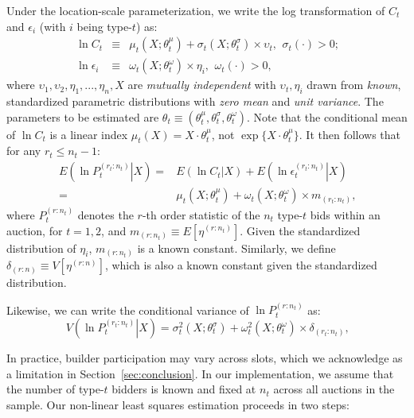 \documentclass[12pt,reqno]{amsart}
\begin{document}
Under the location-scale parameterization, we write the log transformation of $C_{t}$ and $\epsilon _{i}$ (with $i$
being type-$t$) as:%
\begin{eqnarray*}
\ln C_{t} &\equiv &\mu _{t}(X;\theta _{t}^{\mu })+\sigma _{t}(X;\theta
_{t}^{\sigma })\times \upsilon _{t}\text{, }\ \sigma _{t}(\cdot )>0\text{;} \\
\ln \epsilon _{i} &\equiv &\omega _{t}(X;\theta _{t}^{\omega })\times \eta _{i}%
\text{, }\ \omega _{t}(\cdot )>0\text{,}
\end{eqnarray*}%
where $\upsilon _{1},\upsilon _{2},\eta _{1},...,\eta _{n},X$ are \textit{%
mutually independent} with $\upsilon _{t},\eta _{i}$ drawn from \textit{known},
standardized parametric distributions with \textit{zero mean} and \textit{%
unit variance}. 
The parameters to be estimated are $\theta_t \equiv (\theta_t^\mu,\theta_t^\sigma,\theta_t^\omega)$.
Note that the conditional mean of $\ln C_t$ is a linear index $\mu_t(X) = X \cdot \theta_t^\mu$, not $\exp\{X \cdot \theta_t^\mu\}$.
It then follows that for any $r_{t}\leq n_{t}-1$:%
\begin{eqnarray}
E\left( \ln\left. P_{t}^{(r_{t}:n_{t})}\right\vert X\right) = & E(\ln C_{t}|X)+E\left(
\left. \ln \epsilon _{t}^{(r_{t}:n_{t})}\right\vert X\right) \nonumber \\ 
 = & \mu _{t}(X;\theta
_{t}^{\mu })+\omega _{t}(X;\theta _{t}^{\omega })\times m_{(r_{t}:n_{t})}%
\text{,}  \label{eq:location_scale_iden}
\end{eqnarray}%
where $P_t^{(r:n_{t})}$ denotes the $r$-th order statistic of the $n_t$ type-$t$ bids within an auction, for $t=1,2$, and $m_{(r:n_{t})}\equiv E\left[ \eta ^{(r:n_{t})}\right] $. Given the standardized distribution of $\eta _{i}$, $m_{(r:n_{t})}$ is a known constant. Similarly, we define $\delta _{(r:n)}\equiv V\left[ \eta ^{(r:n)}\right] $, which is also a known constant given the standardized distribution.

Likewise, we can write the conditional variance of $\ln P_t^{(r:n_{t})}$ as:
\begin{equation}
  V\left( \left.\ln P_{t}^{(r_{t}:n_{t})}\right\vert X\right) =\sigma
  _{t}^{2}(X;\theta _{t}^{\sigma })+\omega _{t}^{2}(X;\theta _{t}^{\omega
  })\times \delta _{(r_{t}:n_{t})}\text{,}
  \label{eq:variance_orderstat}    
\end{equation}

In practice, builder participation may vary across slots, which we acknowledge as a limitation in Section~\ref{sec:conclusion}. In our implementation, we assume that the number of type-$t$ bidders is known and fixed at $n_{t}$ across all auctions in the sample. Our non-linear least squares estimation proceeds in two steps:\textit{\medskip }
\end{document}
